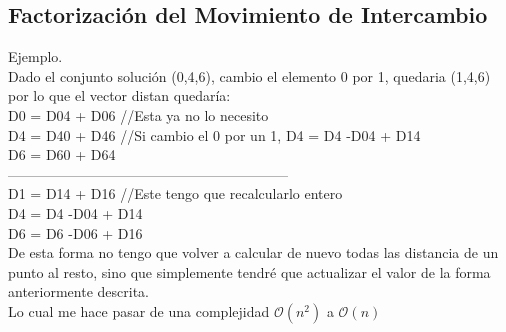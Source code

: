 \subsection{Factorización del Movimiento de Intercambio}
Ejemplo.\\
Dado el conjunto solución (0,4,6), cambio el elemento 0 por 1, quedaria (1,4,6) por lo que el vector distan quedaría:\\
D0 = D04 + D06  //Esta ya no lo necesito\\
D4 = D40 + D46  //Si cambio el 0 por un 1, D4 = D4 -D04 + D14\\
D6 = D60 + D64\\
------------------------------------------------------------\\
D1 = D14 + D16 //Este tengo que recalcularlo entero\\
D4 = D4 -D04 + D14\\
D6 = D6 -D06 + D16\\
 
De esta forma no tengo que volver a calcular de nuevo todas las distancia de un punto al resto,
sino que simplemente tendré que actualizar el valor de la forma anteriormente descrita.\\
Lo cual me hace pasar de una complejidad $\mathcal{O}(n^2)$ a $\mathcal{O}(n)$

